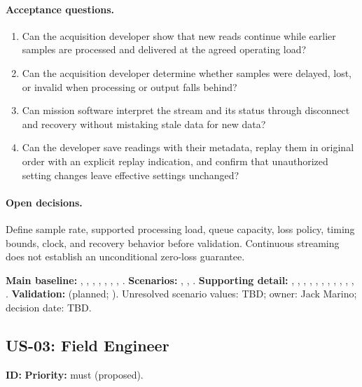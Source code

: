 \paragraph{Acceptance questions.}
\begin{enumerate}
\item Can the acquisition developer show that new reads continue while earlier samples are processed and delivered at the agreed operating load?
\item Can the acquisition developer determine whether samples were delayed, lost, or invalid when processing or output falls behind?
\item Can mission software interpret the stream and its status through disconnect and recovery without mistaking stale data for new data?
\item Can the developer save readings with their metadata, replay them in original order with an explicit replay indication, and confirm that unauthorized setting changes leave effective settings unchanged?
\end{enumerate}
\paragraph{Open decisions.} Define sample rate, supported processing load, queue capacity, loss policy, timing bounds, clock, and recovery behavior before validation. Continuous streaming does not establish an unconditional zero-loss guarantee.

\begingroup\raggedright
\noindent\textbf{Main baseline:} , , , , , , , .
\noindent\textbf{Scenarios:} , , .
\noindent\textbf{Supporting detail:} , , , , , , , , , , , .
\noindent\textbf{Validation:}  (planned; \StatusPending). Unresolved scenario values: TBD; owner: Jack Marino; decision date: TBD.\par\endgroup

\subsection{US-03: Field Engineer}
\noindent\textbf{ID:} \quad\textbf{Priority:} \gls{must} (proposed).

